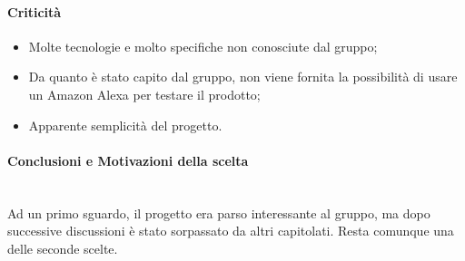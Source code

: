 \paragraph{Criticità}
\begin{itemize}
	\item Molte tecnologie e molto specifiche non conosciute dal gruppo;
	\item Da quanto è stato capito dal gruppo, non viene fornita la possibilità di usare un Amazon Alexa per testare il prodotto;
	\item Apparente semplicità del progetto.
\end{itemize}

\paragraph{Conclusioni e Motivazioni della scelta} ~\\
Ad un primo sguardo, il progetto era parso interessante al gruppo, ma dopo successive discussioni è stato sorpassato da altri capitolati. Resta comunque una delle seconde scelte.